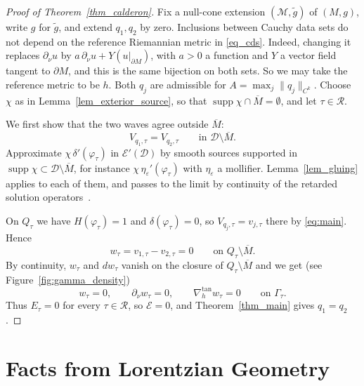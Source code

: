 \documentclass[12pt,reqno]{amsart}
\numberwithin{equation}{section}
\theoremstyle{definition}
\theoremstyle{plain}
\theoremstyle{definition}
\theoremstyle{definition}
\newcommand{\M}{\mathcal{M}}
\newcommand{\D}{\mathcal{D}}
\newcommand{\uu}{M}
\DeclareMathOperator{\supp}{supp}
\begin{document}
\begin{proof}[Proof of Theorem~\ref{thm_calderon}]
Fix a null-cone extension $(\M,\tilde g)$ of $(\uu,g)$, write $g$ for $\tilde g$, and extend $q_1,q_2$ by zero. Inclusions between Cauchy data sets do not depend on the reference Riemannian metric in \eqref{eq_cds}. Indeed, changing it replaces $\partial_\nu u$ by $a\,\partial_\nu u+Y(u|_{\partial\uu})$, with $a>0$ a function and $Y$ a vector field tangent to $\partial\uu$, and this is the same bijection on both sets. So we may take the reference metric to be $h$. Both $q_j$ are admissible for $A=\max_j\|q_j\|_{C^k}$. Choose $\chi$ as in Lemma~\ref{lem_exterior_source}, so that $\supp\chi\cap\overline\uu=\emptyset$, and let $\tau\in\mathcal R$.

We first show that the two waves agree outside $\overline\uu$:
\[
V_{q_1,\tau}=V_{q_2,\tau}\qquad\text{in }\D\setminus\overline\uu .
\]
Approximate $\chi\,\delta'(\varphi_\tau)$ in $\mathcal E'(\D)$ by smooth sources supported in $\supp\chi\subset\D\setminus\overline\uu$, for instance $\chi\,\eta_\varepsilon'(\varphi_\tau)$ with $\eta_\varepsilon$ a mollifier. Lemma~\ref{lem_gluing} applies to each of them, and passes to the limit by continuity of the retarded solution operators~\cite{bar2007}.

On $Q_\tau$ we have $H(\varphi_\tau)=1$ and $\delta(\varphi_\tau)=0$, so $V_{q_j,\tau}=v_{j,\tau}$ there by \eqref{eq:main}. Hence
\[
w_\tau=v_{1,\tau}-v_{2,\tau}=0\qquad\text{on }Q_\tau\setminus\overline\uu .
\]
By continuity, $w_\tau$ and $dw_\tau$ vanish on the closure of $Q_\tau\setminus\overline\uu$ and we get (see Figure~\ref{fig:gamma_density})
\[
w_\tau=0,\qquad \partial_\nu w_\tau=0,\qquad \nabla_h^{\tan}w_\tau=0\qquad\text{on }\Gamma_\tau .
\]
Thus $E_\tau=0$ for every $\tau\in\mathcal R$, so $\mathcal E=0$, and Theorem~\ref{thm_main} gives $q_1=q_2$.
\end{proof}








\appendix



\section{Facts from Lorentzian Geometry}\label{ap_lorentz}
\end{document}
